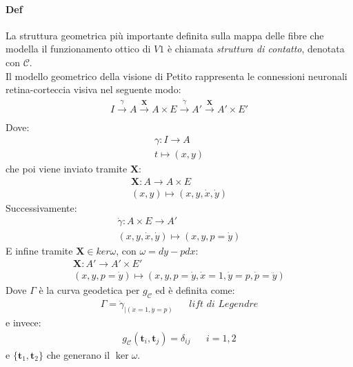 \paragraph*{Def}La struttura geometrica più importante definita sulla mappa delle fibre che modella il funzionamento ottico di $V1$ è chiamata \emph{struttura di contatto}, denotata con $\mathcal{C}$.\\
Il modello geometrico della visione di Petito rappresenta le connessioni neuronali retina-corteccia visiva nel seguente modo:
\begin{align*}
    I\xrightarrow[]{\gamma}A \xrightarrow[]{\mathbf{X}}A\times E\xrightarrow[]{\dot{\gamma}}A'\xrightarrow[]{\mathbf{X}}A'\times E'
\end{align*}
Dove:
\begin{align*}
    \gamma \colon I \to A\\
    t\mapsto (x,y)
\end{align*}
che poi viene inviato tramite $\mathbf{X}$:
\begin{align*}
    \mathbf{X}\colon A \to A\times E\\
    (x,y)\mapsto (x,y,\dot{x},\dot{y})
\end{align*}
Successivamente:
\begin{align*}
    \dot{\gamma}\colon A\times E\to A'\\
    (x,y,\dot{x},\dot{y})\mapsto (x,y,p=\dot{y})
\end{align*}
E infine tramite $\mathbf{X}\in ker\omega$, con $\omega=dy-pdx$:
\begin{align*}
    \mathbf{X}\colon A'\to A'\times E'\\
    (x,y,p=\dot{y})\mapsto (x,y,p=\dot{y},\dot{x}=1,\dot{y}=p,\dot{p}=\ddot{y})
\end{align*}
Dove $\Gamma$ è la curva geodetica per $g_{\mathcal{C}}$ ed è definita come:
\begin{align*}
    \Gamma= \dot{\gamma}_{|(\dot{x}=1,\dot{y}=p)} && \textit{lift di Legendre}
\end{align*}
e invece:
\begin{align*}
    g_{\mathcal{C}}(\mathbf{t}_i,\mathbf{t}_j)=\delta_{ij}&& i=1,2
\end{align*}
e $\{\mathbf{t}_1,\mathbf{t}_2\}$ che generano il $\ker\omega$.


